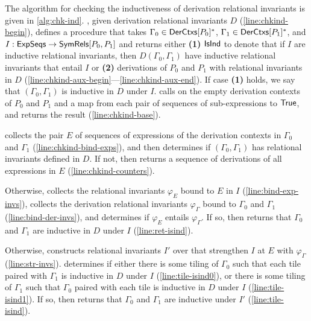 %
%
The algorithm \chkinductive for checking the inductiveness of
derivation relational invariants is given in
\autoref{alg:chk-ind}.
%
\chkinductive, given derivation relational invariants $D$
(\autoref{line:chkind-begin}), defines a procedure \chkindaux that
takes $\Gamma_0 \in \mathsf{DerCtxs}[ P_0 ]^{*}$, $\Gamma_1 \in
\mathsf{DerCtxs}[ P_1 ]^{*}$, and $I: \mathsf{ExpSeqs} \to \mathsf{SymRels}[ P_0, P_1 ]$ and
returns either %
\textbf{(1)} $\mathsf{IsInd}$ to denote that if $I$ are inductive relational
invariants, then $D(\Gamma_0, \Gamma_1)$ have inductive relational
invariants that entail $I$ or
%
%
\textbf{(2)} derivations of $P_0$ and $P_1$ with relational invariants
in $D$
(\autoref{line:chkind-aux-begin}---\autoref{line:chkind-aux-end}).
%
If case \textbf{(1)} holds, we say that $(\Gamma_0, \Gamma_1)$ is
inductive in $D$ under $I$.
%
\chkinductive calls \chkindaux on the empty derivation contexts of
$P_0$ and $P_1$ and a map from each pair of sequences of
sub-expressions to $\mathsf{True}$, and returns the result
(\autoref{line:chkind-base}).

\chkindaux collects the pair $E$ of sequences of expressions of the
derivation contexts in $\Gamma_0$ and $\Gamma_1$
(\autoref{line:chkind-bind-exps}), and then determines if $(\Gamma_0,
\Gamma_1)$ has relational invariants defined in $D$.
%
If not, then \chkindaux returns a sequence of derivations of all
expressions in $E$ (\autoref{line:chkind-counters}).

Otherwise, \chkindaux collects the relational invariants $\varphi_E$
bound to $E$ in $I$ (\autoref{line:bind-exp-invs}), %
collects the derivation relational invariants $\varphi_{\Gamma}$ bound
to $\Gamma_0$ and $\Gamma_1$ (\autoref{line:bind-der-invs}), and %
determines if $\varphi_E$ entails $\varphi_{\Gamma}$.
%
If so, then \chkindaux returns that $\Gamma_0$ and $\Gamma_1$ are
inductive in $D$ under $I$ (\autoref{line:ret-isind}).

Otherwise, \chkindaux constructs relational invariants $I'$ over that
strengthen $I$ at $E$ with $\varphi_{\Gamma}$
(\autoref{line:str-invs}).
%
\chkindaux determines if either there is some tiling of $\Gamma_0$
such that each tile paired with $\Gamma_1$ is inductive in $D$ under
$I$ (\autoref{line:tile-isind0}), or there is some tiling of
$\Gamma_1$ such that $\Gamma_0$ paired with each tile is inductive in
$D$ under $I$ (\autoref{line:tile-isind1}).
%
If so, then \chkindaux returns that $\Gamma_0$ and $\Gamma_1$ are
inductive under $I'$ (\autoref{line:tile-isind}).

